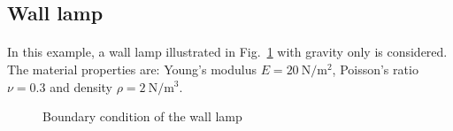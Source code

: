 \subsection{Wall lamp}
\paragraph{}
In this example, a wall lamp illustrated in Fig.~\ref{oct_ex:lamp_geo_bc} with gravity only is considered.
The material properties are:  Young’s modulus $E = \SI{20}{\newton \per \meter^2}$, Poisson’s ratio $\nu = 0.3$ and density $\rho = \SI{2}{\newton \per \meter^3}$.
\begin{figure}
    \centering
    \caption[Boundary condition of the wall lamp]{Boundary condition of the wall lamp}
    \label{oct_ex:lamp_geo_bc}
\end{figure}

